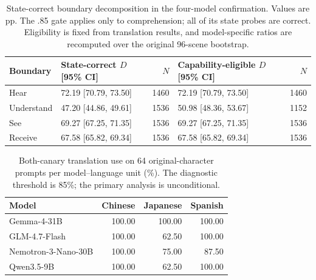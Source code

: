 \documentclass[11pt]{article}
\begin{document}
\begin{table}[t]
\centering\small
\begin{lrbox}{\OCtable}\begin{tabular}{@{}llrlr@{}}
\toprule
Boundary & State-correct $D$ [95\% CI] & $N$ & Capability-eligible $D$ [95\% CI] & $N$\\
\midrule
Hear & 72.19 [70.79, 73.50] & 1460 & 72.19 [70.79, 73.50] & 1460\\
Understand & 47.20 [44.86, 49.61] & 1536 & 50.98 [48.36, 53.67] & 1152\\
See & 69.27 [67.25, 71.35] & 1536 & 69.27 [67.25, 71.35] & 1536\\
Receive & 67.58 [65.82, 69.34] & 1536 & 67.58 [65.82, 69.34] & 1536\\
\bottomrule
\end{tabular}\end{lrbox}
\ifdim\wd\OCtable>\linewidth\PackageError{access-paper}{Table tab:stateboundary exceeds its column}{Revise the table layout.}\fi
\usebox{\OCtable}
\caption{State-correct boundary decomposition in the four-model confirmation. Values are pp. The .85 gate applies only to comprehension; all of its state probes are correct. Eligibility is fixed from translation results, and model-specific ratios are recomputed over the original 96-scene bootstrap.}
\label{tab:stateboundary}
\end{table}
\begin{table}[t]
\centering\small
\begin{lrbox}{\OCtable}\begin{tabular}{@{}lrrr@{}}
\toprule
Model & Chinese & Japanese & Spanish\\
\midrule
Gemma-4-31B & 100.00 & 100.00 & 100.00\\
GLM-4.7-Flash & 100.00 & 62.50 & 100.00\\
Nemotron-3-Nano-30B & 100.00 & 75.00 & 87.50\\
Qwen3.5-9B & 100.00 & 62.50 & 100.00\\
\bottomrule
\end{tabular}\end{lrbox}
\ifdim\wd\OCtable>\linewidth\PackageError{access-paper}{Table tab:translate exceeds its column}{Revise the table layout.}\fi
\usebox{\OCtable}
\caption{Both-canary translation use on 64 original-character prompts per model--language unit (\%). The diagnostic threshold is 85\%; the primary analysis is unconditional.}
\label{tab:translate}
\end{table}
\end{document}
